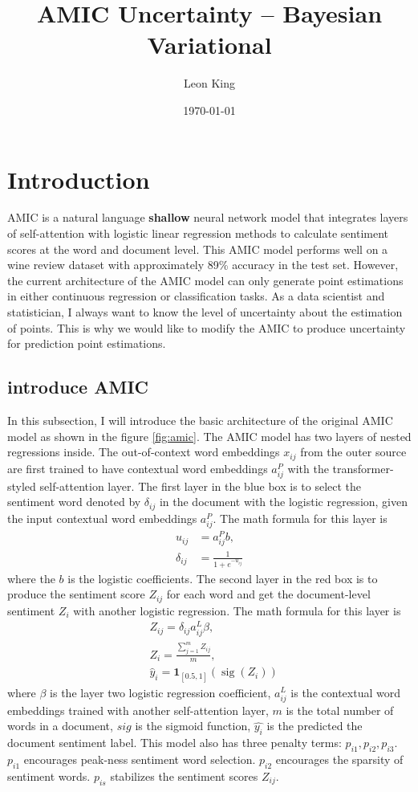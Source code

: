 \documentclass{article}
\title{AMIC Uncertainty – Bayesian Variational}
\author{Leon King}
\date{\today} %
\begin{document}
\maketitle

\section{Introduction}
AMIC is a natural language \textbf{shallow} neural network model that integrates layers of self-attention with logistic linear regression methods to calculate sentiment scores at the word and document level. This AMIC model performs well on a wine review dataset with approximately 89\% accuracy in the test set. However, the current architecture of the AMIC model can only generate point estimations in either continuous regression or classification tasks. As a data scientist and statistician, I always want to know the level of uncertainty about the estimation of points. This is why we would like to modify the AMIC to produce uncertainty for prediction point estimations.

\subsection{introduce AMIC}
In this subsection, I will introduce the basic architecture of the original AMIC model as shown in the figure \ref{fig:amic}. The AMIC model has two layers of nested regressions inside. The out-of-context word embeddings $x_{ij}$ from the outer source are first trained to have contextual word embeddings $a_{ij}^P$ with the transformer-styled self-attention layer. The first layer in the blue box is to select the sentiment word denoted by $\delta_{ij}$ in the document with the logistic regression, given the input contextual word embeddings $a_{ij}^P$. The math formula for this layer is $$\begin{aligned}
u_{i j} & =a_{i j}^P b, \\
\delta_{i j} & =\frac{1}{1+e^{-u_{i j}}}
\end{aligned}$$ where the $b$ is the logistic coefficients. The second layer in the red box is to produce the sentiment score $Z_{ij}$ for each word and get the document-level sentiment $Z_i$ with another logistic regression. The math formula for this layer is $$\begin{aligned}
& Z_{i j}=\delta_{i j} a_{i j}^L \beta, \\
& Z_i=\frac{\sum_{j=1}^m Z_{i j}}{m}, \\
& \hat{y}_i=\mathbf{1}_{[0.5,1]}\left(\operatorname{sig}\left(Z_i\right)\right)
\end{aligned}$$ where $\beta$ is the layer two logistic regression coefficient, $a_{ij}^L$ is the contextual word embeddings trained with another self-attention layer, $m$ is the total number of words in a document, $sig$ is the sigmoid function, $\hat{y_i}$ is the predicted the document sentiment label. This model also has three penalty terms: $p_{i1}, p_{i2}, p_{i3}$. $p_{i1}$ encourages peak-ness sentiment word selection. $p_{i2}$ encourages the sparsity of sentiment words. $p_{is}$ stabilizes the sentiment scores $Z_{ij}$.
\end{document}
